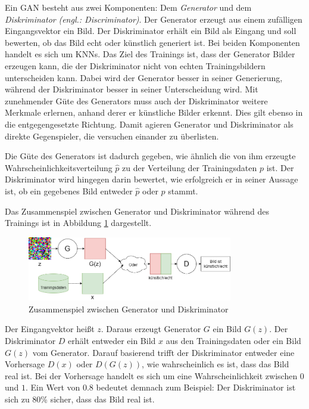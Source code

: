 Ein \ac{GAN} besteht aus zwei Komponenten: Dem \emph{Generator} und dem \emph{Diskriminator} \emph{(engl.: Discriminator)}. Der Generator erzeugt aus einem zufälligen Eingangsvektor ein Bild. Der Diskriminator erhält ein Bild als Eingang und soll bewerten, ob das Bild echt oder künstlich generiert ist. Bei beiden Komponenten handelt es sich um \acp{KNN}. Das Ziel des Trainings ist, dass der Generator Bilder erzeugen kann, die der Diskriminator nicht von echten Trainingsbildern unterscheiden kann. Dabei wird der Generator besser in seiner Generierung, während der Diskriminator besser in seiner Unterscheidung wird. Mit zunehmender Güte des Generators muss auch der Diskriminator weitere Merkmale erlernen, anhand derer er künstliche Bilder erkennt. Dies gilt ebenso in die entgegengesetzte Richtung. Damit agieren Generator und Diskriminator als direkte Gegenspieler, die versuchen einander zu überlisten. \cite{GANs}

Die Güte des Generators ist dadurch gegeben, wie ähnlich die von ihm erzeugte Wahrscheinlichkeitsverteilung $\hat{p}$ zu der Verteilung der Trainingsdaten $p$ ist. Der Diskriminator wird hingegen darin bewertet, wie erfolgreich er in seiner Aussage ist, ob ein gegebenes Bild entweder $\hat{p}$ oder $p$ stammt. \cite{GANs}

Das Zusammenspiel zwischen Generator und Diskriminator während des Trainings ist in Abbildung \ref{fig:gan} dargestellt.
\begin{figure}[H]
	\centering
	\includegraphics[width=0.8\textwidth]{../images/GANs/GAN.drawio.png}
	\caption{Zusammenspiel zwischen Generator und Diskriminator}
	\label{fig:gan}
\end{figure}
Der Eingangvektor heißt $z$. Daraus erzeugt Generator $G$ ein Bild $G(z)$. Der Diskriminator $D$ erhält entweder ein Bild $x$ aus den Trainingsdaten oder ein Bild $G(z)$ vom Generator. Darauf basierend trifft der Diskriminator entweder eine Vorhersage $D(x)$ oder $D(G(z))$, wie wahrscheinlich es ist, dass das Bild real ist. Bei der Vorhersage handelt es sich um eine Wahrscheinlichkeit zwischen $0$ und $1$. Ein Wert von $0.8$ bedeutet demnach zum Beispiel: Der Diskriminator ist sich zu 80\% sicher, dass das Bild real ist. \cite{GANs}

